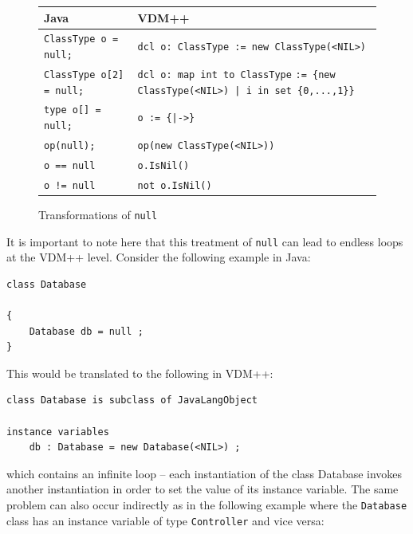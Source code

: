 \documentclass[\pformat,12pt]{article}
\newcommand{\JAVA}{Java}
\newcommand{\VDM}{VDM++}
\begin{document}
\begin{figure}[htbp]
  \begin{center}
\begin{longtable}{|l|p{7cm}|}
\hline
  \JAVA\   & \VDM\ \\ \hline \hline
  \texttt{ClassType o = null;}      & \texttt{dcl o: ClassType := new ClassType(<NIL>)}    \\ \hline
  \texttt{ClassType o[2] = {null};} & \texttt{dcl o: map int to ClassType}
                                      \texttt{:= \{new ClassType(<NIL>) | i in set \{0,...,1\}\}}    \\ \hline
  \texttt{type o[] = null;}         & \texttt{o := \{|->\}}    \\ \hline
  \texttt{op(null);}                & \texttt{op(new ClassType(<NIL>))}    \\ \hline
  \texttt{o == null}                & \texttt{o.IsNil()}    \\ \hline
  \texttt{o != null}                & \texttt{not o.IsNil()}    \\ \hline
\end{longtable}    
    \caption{Transformations of \texttt{null}}
    \label{fig:nullxfs}
  \end{center}
\end{figure}

It is important to note here that this treatment of \texttt{null} can
lead to endless loops at the VDM++ level. Consider the following
example in Java:

\begin{small}
\begin{verbatim}
class Database

{
    Database db = null ;
}
\end{verbatim}
\end{small}

This would be translated to the following in VDM++:

\begin{small}
\begin{verbatim}
class Database is subclass of JavaLangObject

instance variables
    db : Database = new Database(<NIL>) ;
\end{verbatim}
\end{small}

which contains an infinite loop -- each instantiation of the class
Database invokes another instantiation in order to set the value of
its instance variable. The same problem can also occur indirectly as
in the following example where the \texttt{Database} class has an
instance variable of type \texttt{Controller} and vice versa:
\end{document}
